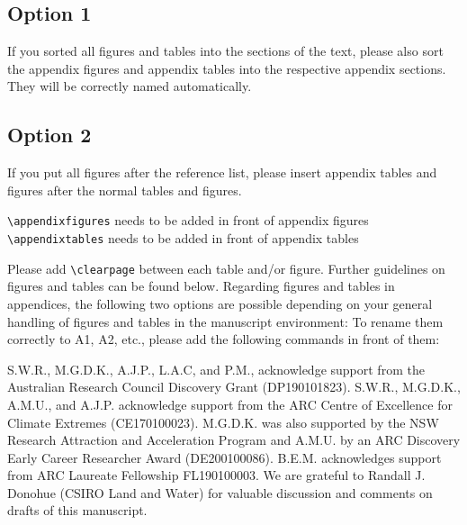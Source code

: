 \documentclass[gc, manuscript]{copernicus}
\begin{document}
\subsection{Option 1}

If you sorted all figures and tables into the sections of the text,
please also sort the appendix figures and appendix tables into the
respective appendix sections. They will be correctly named
automatically.

\subsection{Option 2}

If you put all figures after the reference list, please insert appendix
tables and figures after the normal tables and figures.

\texttt{\textbackslash{}appendixfigures} needs to be added in front of
appendix figures \texttt{\textbackslash{}appendixtables} needs to be
added in front of appendix tables

Please add \texttt{\textbackslash{}clearpage} between each table and/or
figure. Further guidelines on figures and tables can be found below.
Regarding figures and tables in appendices, the following two options
are possible depending on your general handling of figures and tables in
the manuscript environment: To rename them correctly to A1, A2, etc.,
please add the following commands in front of them:
\noappendix




\begin{acknowledgements}
S.W.R., M.G.D.K., A.J.P., L.A.C, and P.M., acknowledge support from the
Australian Research Council Discovery Grant (DP190101823). S.W.R.,
M.G.D.K., A.M.U., and A.J.P. acknowledge support from the ARC Centre of
Excellence for Climate Extremes (CE170100023). M.G.D.K. was also
supported by the NSW Research Attraction and Acceleration Program and
A.M.U. by an ARC Discovery Early Career Researcher Award (DE200100086).
B.E.M. acknowledges support from ARC Laureate Fellowship FL190100003. We
are grateful to Randall J. Donohue (CSIRO Land and Water) for valuable
discussion and comments on drafts of this manuscript.
\end{acknowledgements}
\end{document}
